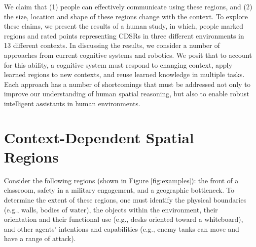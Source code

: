 \documentclass[11pt,letterpaper]{article}
\begin{document}
We claim that (1) people can effectively communicate using these regions, and (2) the size, location and shape of these regions change with the context.  To explore these claims, we present the results of a human study, in which, people marked regions and rated points representing CDSRs in three different environments in 13 different contexts.  In discussing the results, we consider a number of approaches from current cognitive systems and robotics.  We posit that to account for this ability, a cognitive system must respond to changing context, apply learned regions to new contexts, and reuse learned knowledge in multiple tasks.  Each approach has a number of shortcomings that must be addressed not only to improve our understanding of human spatial reasoning, but also to enable robust intelligent assistants in human environments.

\section{Context-Dependent Spatial Regions}\label{sec:cdsrs}

Consider the following regions (shown in Figure \ref{fig:examples}): the front of a classroom, safety in a military engagement, and a geographic bottleneck.  To determine the extent of these regions, one must identify the physical boundaries (e.g., walls, bodies of water), the objects within the environment, their orientation and their functional use (e.g., desks oriented toward a whiteboard), and other agents' intentions and capabilities (e.g., enemy tanks can move and have a range of attack).%
\end{document}
